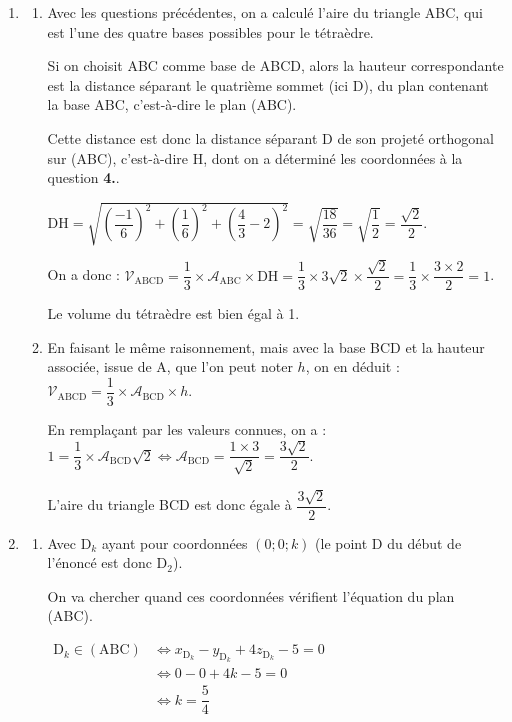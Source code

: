 \begin{enumerate}
	\item \begin{enumerate}
		\item Avec les questions précédentes, on a calculé l'aire du triangle ABC, qui est l'une des quatre bases possibles pour le tétraèdre.

		Si on choisit ABC comme base de ABCD, alors la hauteur correspondante est la distance séparant le quatrième sommet (ici D), du plan contenant la base ABC, c'est-à-dire le plan (ABC).

		Cette distance est donc la distance séparant D de son projeté orthogonal sur (ABC), c'est-à-dire H, dont on a déterminé les coordonnées à la question \textbf{4.}.

		$\mathrm{DH} = \sqrt{\left(\dfrac{-1}{6}\right)^2 + \left(\dfrac{1}{6}\right)^2 + \left(\dfrac{4}{3} - 2\right) ^2 } = \sqrt{\dfrac{18}{36}} = \sqrt{\dfrac{1}{2}} = \dfrac{\sqrt{2}}{2}$.

		On a donc : \quad $\mathcal{V}_{\mathrm{ABCD}} = \dfrac{1}{3} \times \mathcal{A}_{\mathrm{ABC}} \times \mathrm{DH} = \dfrac{1}{3} \times 3\sqrt{2} \times \dfrac{\sqrt{2}}{2} = \dfrac{1}{3} \times \dfrac{3 \times 2}{2} = 1$.

		Le volume du tétraèdre est bien égal à 1.

		\item En faisant le même raisonnement, mais avec la base BCD et la hauteur associée, issue de A, que l'on peut noter $h$, on en déduit :\quad $\mathcal{V}_{\mathrm{ABCD}} = \dfrac{1}{3} \times \mathcal{A}_{\mathrm{BCD}} \times h$.

		En remplaçant par les valeurs connues, on a :\quad $1 = \dfrac{1}{3} \times \mathcal{A}_{\mathrm{BCD}} \sqrt{2} \iff \mathcal{A}_{\mathrm{BCD}} = \dfrac{1 \times 3}{\sqrt{2}} = \dfrac{3\sqrt{2}}{2}$.

		L'aire du triangle BCD est donc égale à $\dfrac{3\sqrt{2}}{2}$.
	\end{enumerate}

	\item \begin{enumerate}
		\item Avec $\mathrm{D}_k$ ayant pour coordonnées $(0 ; 0 ; k)$ (le point D du début de l'énoncé est donc $\mathrm{D}_2$).

		On va chercher quand ces coordonnées vérifient l'équation du plan (ABC).

		$\begin{aligned}
			\mathrm{D}_k \in (\mathrm{ABC})
				&\iff x_{\mathrm{D}_k} - y_{\mathrm{D}_k} + 4z_{\mathrm{D}_k} - 5 = 0\\
				&\iff 0 - 0 +4k  - 5 = 0\\
				&\iff k = \dfrac{5}{4}
 		\end{aligned}$


\end{enumerate}
\end{enumerate}

